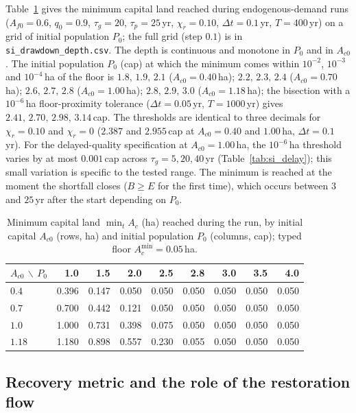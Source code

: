 \documentclass[11pt,a4paper]{article}
\newcommand{\Acmin}{A_c^{\min}}
\begin{document}
Table~\ref{tab:si_drawdown} gives the minimum capital land reached during endogenous-demand runs ($A_{f0}=0.6$, $q_0=0.9$, $\tau_g=20$, $\tau_p=25$\,yr, $\chi_r=0.10$, $\Delta t=0.1$\,yr, $T=400$\,yr) on a grid of initial population $P_0$; the full grid (step $0.1$) is in \texttt{si\_drawdown\_depth.csv}. The depth is continuous and monotone in $P_0$ and in $A_{c0}$. The initial population $P_0$ (cap) at which the minimum comes within $10^{-2}$, $10^{-3}$ and $10^{-4}$\,ha of the floor is $1.8,\,1.9,\,2.1$ ($A_{c0}=0.40$\,ha); $2.2,\,2.3,\,2.4$ ($A_{c0}=0.70$\,ha); $2.6,\,2.7,\,2.8$ ($A_{c0}=1.00$\,ha); $2.8,\,2.9,\,3.0$ ($A_{c0}=1.18$\,ha); the bisection with a $10^{-6}$\,ha floor-proximity tolerance ($\Delta t=0.05$\,yr, $T=1000$\,yr) gives $2.41,\,2.70,\,2.98,\,3.14$\,cap. The thresholds are identical to three decimals for $\chi_r=0.10$ and $\chi_r=0$ ($2.387$ and $2.955$\,cap at $A_{c0}=0.40$ and $1.00$\,ha, $\Delta t=0.1$\,yr). For the delayed-quality specification at $A_{c0}=1.00$\,ha, the $10^{-6}$\,ha threshold varies by at most $0.001$\,cap across $\tau_g=5,20,40$\,yr (Table~\ref{tab:si_delay}); this small variation is specific to the tested range. The minimum is reached at the moment the shortfall closes ($B\ge E$ for the first time), which occurs between $3$ and $25$\,yr after the start depending on $P_0$.

\begin{table}[htbp]
\centering\small
\caption{Minimum capital land $\min_tA_c$ (ha) reached during the run, by initial capital $A_{c0}$ (rows, ha) and initial population $P_0$ (columns, cap); typed floor $\Acmin=0.05$\,ha.}
\label{tab:si_drawdown}
\begin{tabular}{lrrrrrrrr}
\toprule
$A_{c0}$ $\backslash$ $P_0$ & 1.0 & 1.5 & 2.0 & 2.5 & 2.8 & 3.0 & 3.5 & 4.0 \\
\midrule
$0.4$ & 0.396 & 0.147 & 0.050 & 0.050 & 0.050 & 0.050 & 0.050 & 0.050 \\
$0.7$ & 0.700 & 0.442 & 0.121 & 0.050 & 0.050 & 0.050 & 0.050 & 0.050 \\
$1.0$ & 1.000 & 0.731 & 0.398 & 0.075 & 0.050 & 0.050 & 0.050 & 0.050 \\
$1.18$ & 1.180 & 0.898 & 0.557 & 0.230 & 0.055 & 0.050 & 0.050 & 0.050 \\
\bottomrule
\end{tabular}
\end{table}

\subsection{Recovery metric and the role of the restoration flow}\label{si:recovery}
\end{document}
